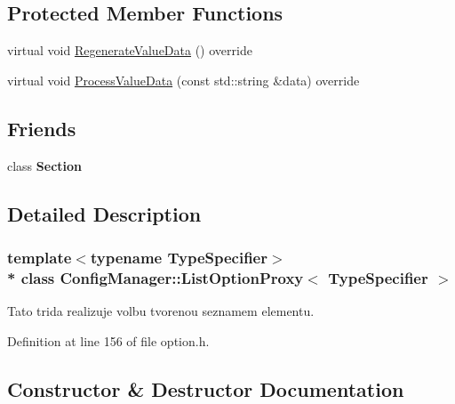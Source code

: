 \subsection*{Protected Member Functions}
\begin{DoxyCompactItemize}
\item 
virtual void \hyperlink{class_config_manager_1_1_list_option_proxy_ab7d04f2f12da920861c6cef6d8dca501}{Regenerate\+Value\+Data} () override
\item 
virtual void \hyperlink{class_config_manager_1_1_list_option_proxy_ade1da6bf53c9bef0806755e4f805284e}{Process\+Value\+Data} (const std\+::string \&data) override
\end{DoxyCompactItemize}
\subsection*{Friends}
\begin{DoxyCompactItemize}
\item 
class {\bfseries Section}\hypertarget{class_config_manager_1_1_list_option_proxy_a0bd6fc422149e1c8416770631b28d40c}{}\label{class_config_manager_1_1_list_option_proxy_a0bd6fc422149e1c8416770631b28d40c}

\end{DoxyCompactItemize}


\subsection{Detailed Description}
\subsubsection*{template$<$typename Type\+Specifier$>$\\*
class Config\+Manager\+::\+List\+Option\+Proxy$<$ Type\+Specifier $>$}

Tato trida realizuje volbu tvorenou seznamem elementu. 

Definition at line 156 of file option.\+h.



\subsection{Constructor \& Destructor Documentation}
